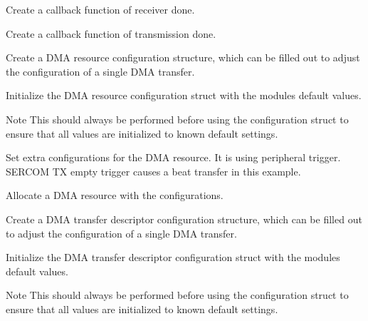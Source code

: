 \begin{DoxyEnumerate}
\item Create a callback function of receiver done. 
\begin{DoxyCodeInclude}{0}
\end{DoxyCodeInclude}

\item Create a callback function of transmission done. 
\begin{DoxyCodeInclude}{0}
\end{DoxyCodeInclude}

\item Create a D\+MA resource configuration structure, which can be filled out to adjust the configuration of a single D\+MA transfer. 
\begin{DoxyCodeInclude}{0}
\end{DoxyCodeInclude}

\item Initialize the D\+MA resource configuration struct with the module\textquotesingle{}s default values. 
\begin{DoxyCodeInclude}{0}
\end{DoxyCodeInclude}
 \begin{DoxyNote}{Note}
This should always be performed before using the configuration struct to ensure that all values are initialized to known default settings.
\end{DoxyNote}

\item Set extra configurations for the D\+MA resource. It is using peripheral trigger. S\+E\+R\+C\+OM TX empty trigger causes a beat transfer in this example. 
\begin{DoxyCodeInclude}{0}
\end{DoxyCodeInclude}

\item Allocate a D\+MA resource with the configurations. 
\begin{DoxyCodeInclude}{0}
\end{DoxyCodeInclude}

\item Create a D\+MA transfer descriptor configuration structure, which can be filled out to adjust the configuration of a single D\+MA transfer. 
\begin{DoxyCodeInclude}{0}
\end{DoxyCodeInclude}

\item Initialize the D\+MA transfer descriptor configuration struct with the module\textquotesingle{}s default values. 
\begin{DoxyCodeInclude}{0}
\end{DoxyCodeInclude}
 \begin{DoxyNote}{Note}
This should always be performed before using the configuration struct to ensure that all values are initialized to known default settings.
\end{DoxyNote}


\end{DoxyEnumerate}
